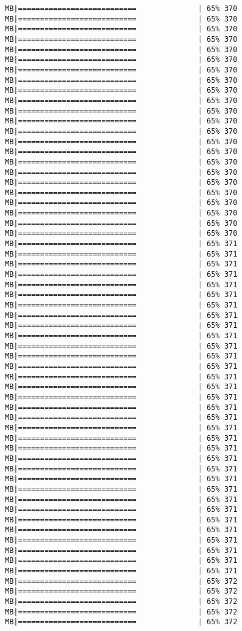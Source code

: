 \documentclass[
]{article}
\begin{document}
\begin{verbatim}
MB|===========================              | 65% 370 MB|===========================              | 65% 370 MB|===========================              | 65% 370 MB|===========================              | 65% 370 MB|===========================              | 65% 370 MB|===========================              | 65% 370 MB|===========================              | 65% 370 MB|===========================              | 65% 370 MB|===========================              | 65% 370 MB|===========================              | 65% 370 MB|===========================              | 65% 370 MB|===========================              | 65% 370 MB|===========================              | 65% 370 MB|===========================              | 65% 370 MB|===========================              | 65% 370 MB|===========================              | 65% 370 MB|===========================              | 65% 370 MB|===========================              | 65% 370 MB|===========================              | 65% 370 MB|===========================              | 65% 370 MB|===========================              | 65% 370 MB|===========================              | 65% 370 MB|===========================              | 65% 370 MB|===========================              | 65% 371 MB|===========================              | 65% 371 MB|===========================              | 65% 371 MB|===========================              | 65% 371 MB|===========================              | 65% 371 MB|===========================              | 65% 371 MB|===========================              | 65% 371 MB|===========================              | 65% 371 MB|===========================              | 65% 371 MB|===========================              | 65% 371 MB|===========================              | 65% 371 MB|===========================              | 65% 371 MB|===========================              | 65% 371 MB|===========================              | 65% 371 MB|===========================              | 65% 371 MB|===========================              | 65% 371 MB|===========================              | 65% 371 MB|===========================              | 65% 371 MB|===========================              | 65% 371 MB|===========================              | 65% 371 MB|===========================              | 65% 371 MB|===========================              | 65% 371 MB|===========================              | 65% 371 MB|===========================              | 65% 371 MB|===========================              | 65% 371 MB|===========================              | 65% 371 MB|===========================              | 65% 371 MB|===========================              | 65% 371 MB|===========================              | 65% 371 MB|===========================              | 65% 371 MB|===========================              | 65% 371 MB|===========================              | 65% 371 MB|===========================              | 65% 371 MB|===========================              | 65% 372 MB|===========================              | 65% 372 MB|===========================              | 65% 372 MB|===========================              | 65% 372 MB|===========================              | 65% 372 
\end{verbatim}
\end{document}
